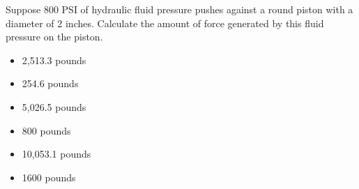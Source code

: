 Suppose 800 PSI of hydraulic fluid pressure pushes against a round piston with a diameter of 2 inches.  Calculate the amount of force generated by this fluid pressure on the piston.

\begin{itemize}
\item{} 2,513.3 pounds
\vskip 5pt 
\item{} 254.6 pounds
\vskip 5pt 
\item{} 5,026.5 pounds
\vskip 5pt 
\item{} 800 pounds
\vskip 5pt 
\item{} 10,053.1 pounds
\vskip 5pt 
\item{} 1600 pounds
\end{itemize}





